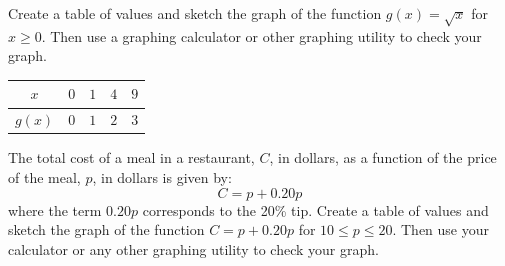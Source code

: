 \begin{exercise}
Create a table of values and sketch the graph of the function $g(x)=\sqrt{x}$ for $x\geq 0$. Then use a graphing calculator or other graphing utility to check your graph.
\end{exercise}



\begin{solution}

\begin{minipage}{0.5\textwidth}
\begin{tabular}{|c|c|c|c|c|} \hline
$x$ & $0$ & $1$ & $4$ & $9$  \\ \hline
$g(x)$ & $0$ & $1$ & $2$ & $3$ \\\hline
\end{tabular}
\end{minipage}
\begin{minipage}{0.5\textwidth}
\end{minipage}
\end{solution}







\begin{exercise}
The total cost of a meal in a restaurant, $C$, in dollars, as a function of the price of the meal, $p$, in dollars is given by:
\[C=p+0.20p\]
where the term $0.20p$ corresponds to the 20\% tip. Create a table of values and sketch the graph of the function $C=p+0.20p$ for $10\leq p\leq 20$. Then use your calculator or any other graphing utility to check your graph. 
\end{exercise}

